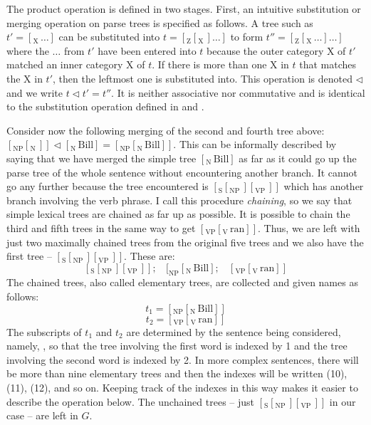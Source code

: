 The product operation is defined in two stages. First, an intuitive substitution or merging operation on parse trees is specified as follows. A tree such as $t' = [_{\mathrm{X}}\, \ldots ]$ can be substituted into $t = [_{\mathrm{Z}} [_{\mathrm{X}}\, ] \ldots ]$ to form $t'' = [_{\mathrm{Z}} [_{\mathrm{X}}\, \ldots ] \ldots ]$ where the $\ldots$ from $t'$ have been entered into $t$ because the outer category X of $t'$ matched an inner category X of $t$. If there is more than one X in $t$ that matches the X in $t'$, then the leftmost one is substituted into. This operation is denoted $\lhd$ and we write $t \lhd t' = t''$. It is neither associative nor commutative and is identical to the substitution operation defined in \citet{joshi:tag} and \citet{joshi:tag2}.

Consider now the following merging of the second and fourth tree above: $[_{\mathrm{NP}} [_{\mathrm{N}}\, ]] \lhd [_{\mathrm{N}}\, \mathrm{Bill}] = [_{\mathrm{NP}} [_{\mathrm{N}}\, \mathrm{Bill}]]$. This can be informally described by saying that we have merged the simple tree $[_{\mathrm{N}}\, \mathrm{Bill}]$ as far as it could go up the parse tree of the whole sentence without encountering another branch. It cannot go any further because the tree encountered is $[_{\mathrm{S}}[_{\mathrm{NP}}\, ][_{\mathrm{VP}}\, ]]$ which has another branch involving the verb phrase. I call this procedure \emph{chaining}, so we say that simple lexical trees are chained as far up as possible. It is possible to chain the third and fifth trees in the same way to get $[_{\mathrm{VP}}[_{\mathrm{V}}\, \mathrm{ran}]]$. Thus, we are left with just two maximally chained trees from the original five trees and we also have the first tree -- $[_{\mathrm{S}}[_{\mathrm{NP}}\, ][_{\mathrm{VP}}\, ]]$. These are:
\[[_{\mathrm{S}}[_{\mathrm{NP}}\, ][_{\mathrm{VP}}\, ]];\ \ \ \ [_{\mathrm{NP}} [_{\mathrm{N}}\, \mathrm{Bill}];\ \ \ \ [_{\mathrm{VP}}[_{\mathrm{V}}\, \mathrm{ran}]]\]
The chained trees, also called elementary trees, are collected and given names as follows:
\[t_1 = [_{\mathrm{NP}} [_{\mathrm{N}}\, \mathrm{Bill}]]\]
\[t_2 = [_{\mathrm{VP}}[_{\mathrm{V}}\, \mathrm{ran}]]\]
The subscripts of $t_1$ and $t_2$ are determined by the sentence being considered, namely, , so that the tree involving the first word  is indexed by 1 and the tree involving the second word  is indexed by 2. In more complex sentences, there will be more than nine elementary trees and then the indexes will be written (10), (11), (12), and so on. Keeping track of the indexes in this way makes it easier to describe the operation below. The unchained trees -- just $[_{\mathrm{S}}[_{\mathrm{NP}}\, ][_{\mathrm{VP}}\, ]]$ in our case -- are left in $G$. 

